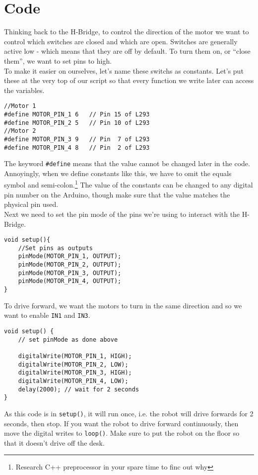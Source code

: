 \documentclass[../TinyBot.tex]{subfiles}
\begin{document}
\section{Code}





Thinking back to the H-Bridge, to control the direction of the motor we want to control which
switches are closed and which are open. Switches are generally active low - which means that 
they are off by default. To turn them on, or ``close them'', we want to set pins to high. \\

To make it easier on ourselves, let's name these switchs as constants. Let's put these
at the very top of our script so that every function we write later can access the variables. 

\begin{lstlisting}
//Motor 1
#define MOTOR_PIN_1 6   // Pin 15 of L293
#define MOTOR_PIN_2 5   // Pin 10 of L293
//Motor 2
#define MOTOR_PIN_3 9   // Pin  7 of L293
#define MOTOR_PIN_4 8   // Pin  2 of L293
\end{lstlisting}

The keyword \lstinline[]!#define! means that the value cannot be changed later in the code.
Annoyingly, when we define constants like this, we have to omit the equals symbol and
semi-colon.\footnote{Research C++ preprocessor in your spare time to finc out why}
The value of the constants can be changed to any digital pin number on the Arduino,
though make sure that the value matches the physical pin used. \\


Next we need to set the pin mode of the pins we're using to interact with the H-Bridge.

\begin{lstlisting}
void setup(){
    //Set pins as outputs
    pinMode(MOTOR_PIN_1, OUTPUT);
    pinMode(MOTOR_PIN_2, OUTPUT);
    pinMode(MOTOR_PIN_3, OUTPUT);
    pinMode(MOTOR_PIN_4, OUTPUT);
}
\end{lstlisting}


To drive forward, we want the motors to turn in the same direction and so we want to enable \lstinline[]!IN1! and \lstinline[]!IN3!. 

\begin{lstlisting}
void setup() {
    // set pinMode as done above

    digitalWrite(MOTOR_PIN_1, HIGH);
    digitalWrite(MOTOR_PIN_2, LOW);
    digitalWrite(MOTOR_PIN_3, HIGH);
    digitalWrite(MOTOR_PIN_4, LOW);
    delay(2000); // wait for 2 seconds
}
\end{lstlisting}
As this code is in \lstinline[]!setup()!, it will run once, i.e. the robot will drive forwards for 2 seconds, then stop. If you want the robot to drive forward continuously, then move the digital writes to \lstinline[]!loop()!. Make sure to put the robot on the floor so that it doesn't drive off the desk.
\end{document}

